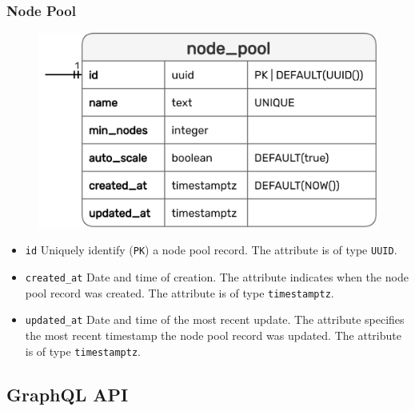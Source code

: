 \subsubsection{Node Pool}
\label{subsubsec:implementation_server_database_node_pool}

\begin{figure}
  \centering
  \includegraphics[width=\linewidth]{images/implementation/erm_node_pool.png}
\end{figure}

\begin{itemize}
  \item \texttt{id}
    \newline
    Uniquely identify (\texttt{PK}) a node pool record.
    \newline
    The attribute is of type \texttt{UUID}.

  \item \texttt{created\_at}
    \newline
    Date and time of creation.
    \newline
    The attribute indicates when the node pool record was created.
    \newline
    The attribute is of type \texttt{timestamptz}.

  \item \texttt{updated\_at}
    \newline
    Date and time of the most recent update.
    \newline
    The attribute specifies the most recent timestamp the node pool record was updated.
    \newline
    The attribute is of type \texttt{timestamptz}.
\end{itemize}

\subsection{GraphQL API}
\label{subsec:implementation_server_graphql}

